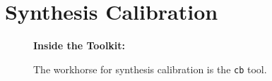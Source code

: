 

\chapter{Synthesis Calibration}
\label{chapter:cal}

\begin{wrapfigure}{r}{2.5in}
  \begin{boxedminipage}{2.5in}
     \centerline{\bf Inside the Toolkit:}
     The workhorse for synthesis calibration is the {\tt cb} tool.
  \end{boxedminipage}
\end{wrapfigure}

